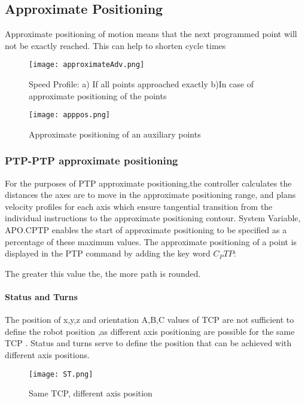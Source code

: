 \documentclass[a4paper]{report}
\begin{document}
\subsection{Approximate Positioning}
Approximate positioning of motion means that the next programmed point will not be exactly reached. This can help to shorten cycle times
 \begin{figure}[h]
	\caption{Speed Profile:
	\newline a) If all points approached exactly
	\newline b)In  case of approximate positioning of the points}
	\centering
	\texttt{[image: approximateAdv.png]}
\end{figure}
\begin{figure}[h]
	\caption{Approximate positioning of an auxiliary points}
	\centering
	\texttt{[image: apppos.png]}
\end{figure}
\subsubsection{PTP-PTP approximate positioning }
For the purposes of PTP approximate positioning,the controller calculates the distances the axes are to move in the approximate positioning range, and plans velocity profiles for each axis which ensure tangential transition from the individual instructions to the approximate positioning contour.
\vspace{0.3cm} 
\newline System Variable, \textdollar APO.CPTP enables the start of approximate positioning to be specified as a percentage of these maximum values.
The approximate positioning of a point is displayed in the PTP command by adding the key word $C_PTP$: 


	\vspace{0.8cm} \centering {}
	
\vspace{0.3cm} The greater this value the, the more path is rounded.
\newpage


\paragraph{Status and Turns}
\vspace{0.3cm}
The position of x,y,z and orientation A,B,C values of TCP are not sufficient to define the robot position ,as different axis positioning  are possible for the same TCP .
Status and turns serve to define the position that can be achieved with different axis positions.
\begin{figure}[h]
	\caption{Same TCP, different axis position}
	\centering
	\texttt{[image: ST.png]}
\end{figure}
\end{document}
